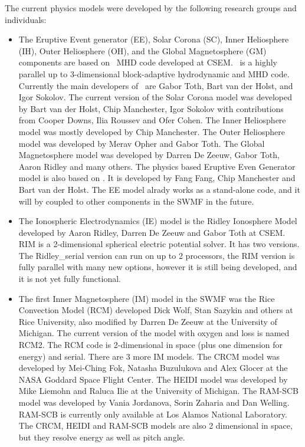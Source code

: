 The current physics 
models were developed by the following research groups
and individuals:
\begin{itemize}
\item
The Eruptive Event generator (EE), Solar Corona (SC), Inner Heliosphere (IH), 
Outer Heliosphere (OH), and the Global Magnetosphere (GM) 
components are based on \BATSRUS\ MHD code developed at CSEM. 
\BATSRUS\ is a highly parallel up to 3-dimensional block-adaptive 
hydrodynamic and MHD code. 
Currently the main developers of \BATSRUS\ are Gabor Toth,
Bart van der Holst, and Igor Sokolov.
The current version of the Solar Corona model was developed
by Bart van der Holst, Chip Manchester, Igor Sokolov with contributions
from Cooper Downs, Ilia Roussev and Ofer Cohen. 
The Inner Heliosphere model was mostly developed by Chip Manchester.
The Outer Heliosphere model was developed by Merav Opher and Gabor Toth. 
The Global Magnetosphere model was developed by 
Darren De Zeeuw, Gabor Toth, Aaron Ridley and many others.
The physics based Eruptive Even Generator model is also based on
\BATSRUS. It is developed by Fang Fang, Chip Manchester and Bart van
der Holst. The EE model alrady works as a stand-alone code, and
it will by coupled to other components in the SWMF in the future.

\item
The Ionospheric Electrodynamics (IE) model is the Ridley Ionosphere Model
developed by Aaron Ridley, Darren De Zeeuw and Gabor Toth at CSEM.
RIM  is a 2-dimensional spherical electric potential solver.
It has two versions. The Ridley\_serial version can run on up to 2 processors,
the RIM version is fully parallel with many new options, however it is still
being developed, and it is not yet fully functional.

\item
The first Inner Magnetosphere (IM) model in the SWMF was
the Rice Convection Model (RCM) developed Dick Wolf, Stan Sazykin and 
others at Rice University, also modified by Darren De Zeeuw at the
University of Michigan. The current version of the model with oxygen and loss
is named RCM2. The RCM code is 2-dimensional in space 
(plus one dimension for energy) and serial. There are 3 more IM models.
The CRCM model was developed by Mei-Ching Fok, Natasha Buzulukova and 
Alex Glocer at the NASA Goddard Space Flight Center.
The HEIDI model was developed by Mike Liemohn and Raluca Ilie 
at the University of Michigan.
The RAM-SCB model was developed by Vania Jordanova, Sorin Zaharia and
Dan Welling. RAM-SCB is currently only available at Los Alamos National
Laboratory. The CRCM, HEIDI and RAM-SCB models are also 2 dimensional
in space, but they resolve energy as well as pitch angle.


\end{itemize}
